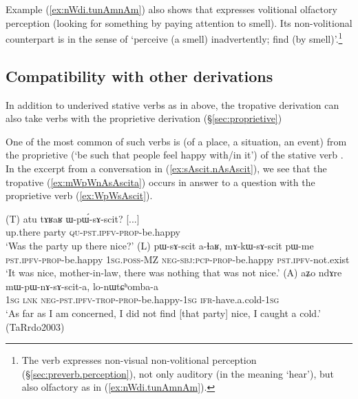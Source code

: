 Example (\ref{ex:nWdi.tunAmnAm}) also shows that   expresses volitional olfactory perception (looking for something by paying attention to smell). Its non-volitional counterpart is  in the sense of `perceive (a smell) inadvertently; find (by smell)'.\footnote{The verb  expresses non-visual non-volitional perception (§\ref{sec:preverb.perception}), not only auditory (in the meaning `hear'), but also olfactory as in (\ref{ex:nWdi.tunAmnAm}). }


\subsection{Compatibility with other derivations} \label{sec:tropative.other.derivations}
In addition to underived stative verbs as in  above, the tropative derivation can also take verbs with the proprietive  derivation (§\ref{sec:proprietive})


One of the most common of such verbs is  (of a place, a situation, an event) from the proprietive  (`be such that people feel happy with/in it') of the stative verb . In the excerpt from a conversation in (\ref{ex:sAscit.nAsAscit}), we see that the tropative  (\ref{ex:mWpWnAsAscita}) occurs in answer to a question with the proprietive verb  (\ref{ex:WpWsAscit}). 


\begin{exe}
\ex \label{ex:sAscit.nAsAscit}
\begin{xlist}
\ex \label{ex:WpWsAscit}
\gll (T) atu tɤʁaʁ ɯ-pɯ́-sɤ-scit? [...] \\
{ } up.there party \textsc{qu}-\textsc{pst}.\textsc{ipfv}-\textsc{prop}-be.happy \\
\glt `Was the party up there nice?'
\ex \label{ex:pWsAscit.alhaR}
\gll (L)  pɯ-sɤ-scit a-ɬaʁ, mɤ-kɯ-sɤ-scit pɯ-me \\
{ } \textsc{pst}.\textsc{ipfv}-\textsc{prop}-be.happy \textsc{1sg}.\textsc{poss}-MZ \textsc{neg}-\textsc{sbj}:\textsc{pcp}-\textsc{prop}-be.happy \textsc{pst}.\textsc{ipfv}-not.exist \\
\glt `It was nice, mother-in-law, there was nothing that was not nice.'
\ex \label{ex:mWpWnAsAscita}
\gll (A) aʑo ndɤre mɯ-pɯ-nɤ-sɤ-scit-a, lo-nɯtɕʰomba-a \\
{ } \textsc{1sg} \textsc{lnk} \textsc{neg}-\textsc{pst}.\textsc{ipfv}-\textsc{trop}-\textsc{prop}-be.happy-\textsc{1sg} \textsc{ifr}-have.a.cold-\textsc{1sg} \\
\glt `As far as I am concerned, I did not find [that party] nice, I caught a cold.' (TaRrdo2003)
\end{xlist}
\end{exe}

